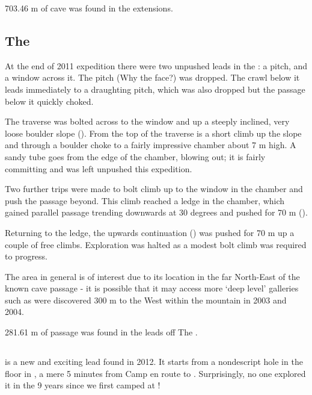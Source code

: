 703.46 m of cave was found in the  extensions.


\subsection{\texorpdfstring{The }{The Throne Room}}

At the end of 2011 expedition there were two unpushed leads in the
: a pitch, and a window across it. The pitch (Why the
face?) was dropped. The crawl below it leads immediately to a draughting
pitch, which was also dropped but the passage below it quickly choked.

The traverse was bolted across to the window and up a steeply inclined,
very loose boulder slope (). From the top of the traverse is a
short climb up the slope and through a boulder choke to a fairly
impressive chamber about 7 m high. A sandy tube goes from the edge of
the chamber, blowing out; it is fairly committing and was left unpushed
this expedition.

Two further trips were made to bolt climb up to the window in the
chamber and push the passage beyond. This climb reached a ledge in the
chamber, which gained parallel passage trending downwards at 30 degrees
and pushed for 70 m ().

Returning to the ledge, the upwards continuation ()
was pushed for 70 m up a couple of free climbs. Exploration was halted
as a modest bolt climb was required to progress.

The area in general is of interest due to its location in the far
North-East of the known cave passage - it is possible that it may access
more `deep level' galleries such as were discovered 300 m to the West
within the mountain in 2003 and 2004.

281.61 m of passage was found in the leads off The .


\subsection{\texorpdfstring{}{Xanadu}}

 is a new and exciting lead found in 2012. It starts from a
nondescript hole in the floor in , a mere 5
minutes from Camp  en route to . Surprisingly, no one explored it in the 9 years since we
first camped at !


